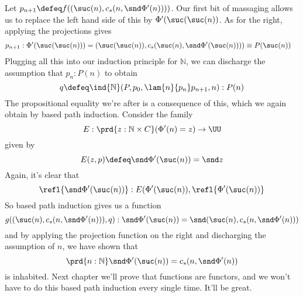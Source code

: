 Let $p_{n+1} \defeq f((\suc(n), c_{s}(n, \snd \Phi'(n))))$.
Our first bit of massaging allows us to replace the left hand side of this by
$\Phi'(\suc(\suc(n))$.  As for the right, applying the projections gives
\begin{align*}
p_{n+1} &: \Phi'(\suc(\suc(n))) 
=
(\suc(\suc(n)), c_{s}(\suc(n), \snd\Phi'(\suc(n)))) 
\equiv P(\suc(n))
\end{align*}
Plugging all this into our induction principle for $\mathbb{N}$, we can
discharge the assumption that $p_{n} : P(n)$ to obtain
\[
q \defeq \ind{\mathbb{N}}(P, p_{0}, \lam{n}{p_{n}}p_{n+1}, n) : P(n)
\]
The propositional equality we're after is a consequence of this, which we again
obtain by based path induction.  Consider the family
\[
  E : \prd{z:\mathbb{N} \times C}(\Phi'(n) = z) \to \UU
\]
given by
\[
  E(z, p) \defeq 
  \snd\Phi'(\suc(n)) = \snd z
\]
Again, it's clear that
\[
\refl{\snd\Phi'(\suc(n))} : E(\Phi'(\suc(n)), \refl{\Phi'(\suc(n))}
\]
So based path induction gives us a function
\[
  g((\suc(n), c_{s}(n, \snd\Phi'(n))), q) : 
  \snd\Phi'(\suc(n)) = \snd (\suc(n), c_{s}(n, \snd\Phi'(n)))
\]
and by applying the projection function on the right and discharging the
assumption of $n$, we have shown that
\[
  \prd{n:\mathbb{N}}\snd\Phi'(\suc(n)) = c_{s}(n, \snd\Phi'(n))
\]
is inhabited.  Next chapter we'll prove that functions are functors, and we
won't have to do this based path induction every single time.  It'll be great.
